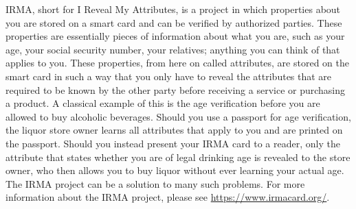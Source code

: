 \documentclass[a4paper, oneside]{scrartcl}
\begin{document}



IRMA, short for I Reveal My Attributes, is a project in which properties about you are stored on a smart card and can be verified by authorized parties. These properties are essentially pieces of information about what you are, such as your age, your social security number, your relatives; anything you can think of that applies to you. These properties, from here on called attributes, are stored on the smart card in such a way that you only have to reveal the attributes that are required to be known by the other party before receiving a service or purchasing a product. A classical example of this is the age verification before you are allowed to buy alcoholic beverages. Should you use a passport for age verification, the liquor store owner learns all attributes that apply to you and are printed on the passport. Should you instead present your IRMA card to a reader, only the attribute that states whether you are of legal drinking age is revealed to the store owner, who then allows you to buy liquor without ever learning your actual age. The IRMA project can be a solution to many such problems. For more information about the IRMA project, please see \url{https://www.irmacard.org/}.
\end{document}

